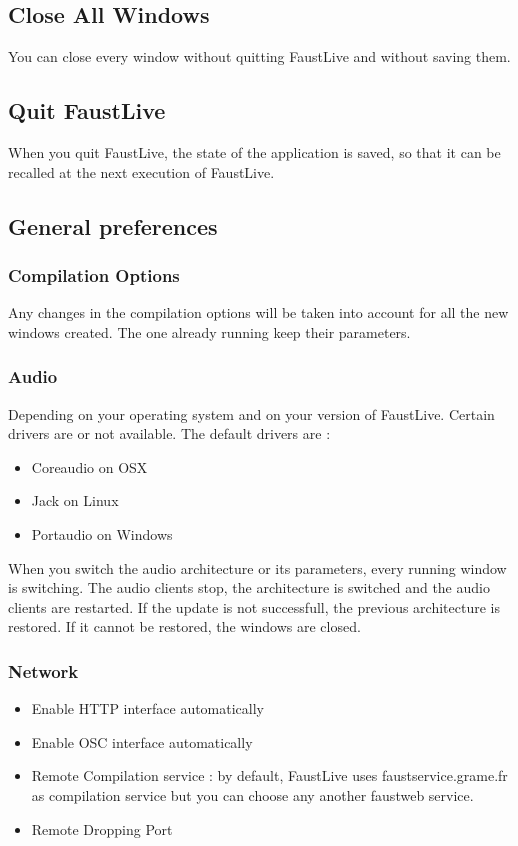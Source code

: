 \documentclass[a4paper]{article}
\begin{document}
\subsection{Close All Windows}
You can close every window without quitting FaustLive and without saving them.

\subsection{Quit FaustLive}

When you quit FaustLive, the state of the application is saved, so that it can be recalled at the next execution of FaustLive.

\subsection{General preferences}
\subsubsection{Compilation Options}
Any changes in the compilation options will be taken into account for all the new windows created. The one already running keep their parameters.
\subsubsection{Audio}
 
Depending on your operating system and on your version of FaustLive. Certain drivers are or not available.
The default drivers are :
\begin{itemize}
\item Coreaudio on OSX
\item Jack on Linux
\item Portaudio on Windows
\end{itemize}

When you switch the audio architecture or its parameters, every running window is switching. The audio clients stop, the architecture is switched and the audio clients are restarted. If the update is not successfull, the previous architecture is restored. If it cannot be restored, the windows are closed. 

\subsubsection{Network}
\begin{itemize}
\item Enable HTTP interface automatically
\item Enable OSC interface automatically
\item Remote Compilation service : by default, FaustLive uses faustservice.grame.fr as compilation service but you can choose any another faustweb service.
\item Remote Dropping Port

\end{itemize}
\end{document}
